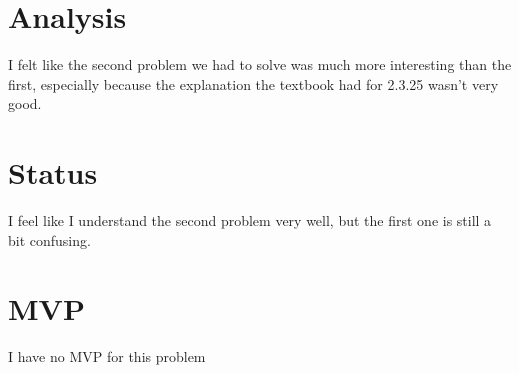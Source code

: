 \documentclass[11pt]{article} %
\begin{document}
\section* {Analysis}
I felt like the second problem we had to solve was much more interesting than the first, especially because the explanation the textbook had for 2.3.25 wasn't very good. 

\section* {Status}
I feel like I understand the second problem very well, but the first one is still a bit confusing.

\section* {MVP}
I have no MVP for this problem
\end{document}

